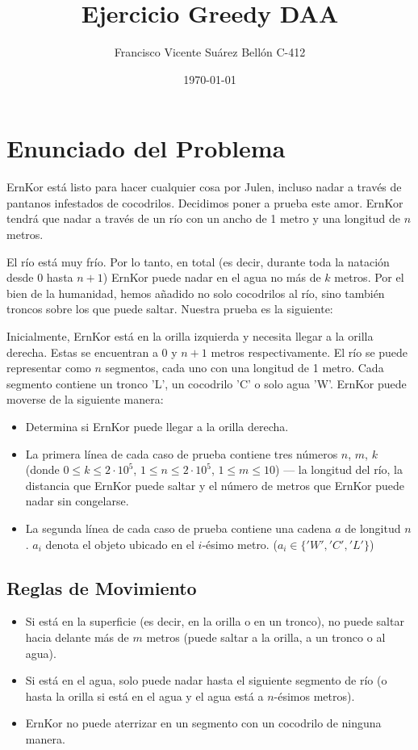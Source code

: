 \documentclass{article}
\title{Ejercicio Greedy DAA}
\author{Francisco Vicente Suárez Bellón C-412}
\date{\today}
\begin{document}
\maketitle

\section{Enunciado del Problema}

ErnKor está listo para hacer cualquier cosa por Julen, incluso nadar a través de pantanos infestados de cocodrilos. Decidimos poner a prueba este amor. ErnKor tendrá que nadar a través de un río con un ancho de 1 metro y una longitud de \(n\) metros.

El río está muy frío. Por lo tanto, en total (es decir, durante toda la natación desde 0 hasta \(n+1\)) ErnKor puede nadar en el agua no más de \(k\) metros. Por el bien de la humanidad, hemos añadido no solo cocodrilos al río, sino también troncos sobre los que puede saltar. Nuestra prueba es la siguiente:

Inicialmente, ErnKor está en la orilla izquierda y necesita llegar a la orilla derecha. Estas se encuentran a 0 y \(n+1\) metros respectivamente. El río se puede representar como \(n\) segmentos, cada uno con una longitud de 1 metro. Cada segmento contiene un tronco 'L', un cocodrilo 'C' o solo agua 'W'. ErnKor puede moverse de la siguiente manera:

\begin{itemize}
    \item Determina si ErnKor puede llegar a la orilla derecha.
    \item La primera línea de cada caso de prueba contiene tres números \(n\), \(m\), \(k\) (donde \(0 \leq k \leq 2 \cdot 10^5\), \(1 \leq n \leq 2 \cdot 10^5\), \(1 \leq m \leq 10\)) — la longitud del río, la distancia que ErnKor puede saltar y el número de metros que ErnKor puede nadar sin congelarse.
    \item La segunda línea de cada caso de prueba contiene una cadena \(a\) de longitud \(n\). \(a_i\) denota el objeto ubicado en el \(i\)-ésimo metro. (\(a_i \in \{ 'W', 'C', 'L' \}\))
\end{itemize}

\subsection{Reglas de Movimiento}
\begin{itemize}
    \item Si está en la superficie (es decir, en la orilla o en un tronco), no puede saltar hacia delante más de \(m\) metros (puede saltar a la orilla, a un tronco o al agua).
    \item Si está en el agua, solo puede nadar hasta el siguiente segmento de río (o hasta la orilla si está en el agua y el agua está a \(n\)-ésimos metros).
    \item ErnKor no puede aterrizar en un segmento con un cocodrilo de ninguna manera.
\end{itemize}
\end{document}

